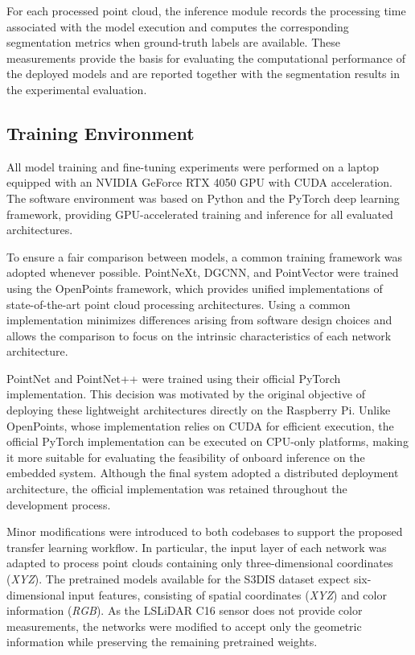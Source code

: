 For each processed point cloud, the inference module records the processing time associated with the model execution and computes the corresponding segmentation metrics when ground-truth labels are available. These measurements provide the basis for evaluating the computational performance of the deployed models and are reported together with the segmentation results in the experimental evaluation.


\subsection{Training Environment}
\label{subsec:training_environment}

All model training and fine-tuning experiments were performed on a laptop equipped with an NVIDIA GeForce RTX 4050 GPU with CUDA acceleration. The software environment was based on Python and the PyTorch deep learning framework, providing GPU-accelerated training and inference for all evaluated architectures.

To ensure a fair comparison between models, a common training framework was adopted whenever possible. PointNeXt, DGCNN, and PointVector were trained using the OpenPoints framework, which provides unified implementations of state-of-the-art point cloud processing architectures. Using a common implementation minimizes differences arising from software design choices and allows the comparison to focus on the intrinsic characteristics of each network architecture.

PointNet and PointNet++ were trained using their official PyTorch implementation. This decision was motivated by the original objective of deploying these lightweight architectures directly on the Raspberry Pi. Unlike OpenPoints, whose implementation relies on CUDA for efficient execution, the official PyTorch implementation can be executed on CPU-only platforms, making it more suitable for evaluating the feasibility of onboard inference on the embedded system. Although the final system adopted a distributed deployment architecture, the official implementation was retained throughout the development process.

Minor modifications were introduced to both codebases to support the proposed transfer learning workflow. In particular, the input layer of each network was adapted to process point clouds containing only three-dimensional coordinates (\textit{XYZ}). The pretrained models available for the S3DIS dataset expect six-dimensional input features, consisting of spatial coordinates (\textit{XYZ}) and color information (\textit{RGB}). As the LSLiDAR C16 sensor does not provide color measurements, the networks were modified to accept only the geometric information while preserving the remaining pretrained weights.

